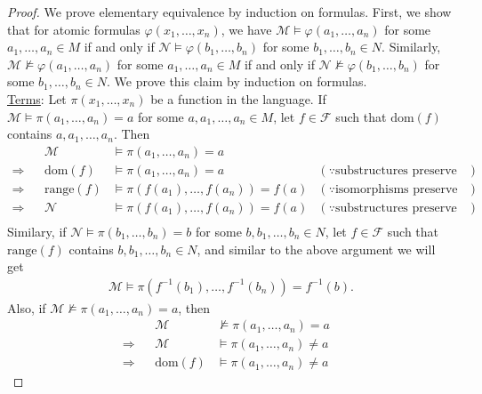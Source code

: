 \documentclass{article}
\begin{document}
\begin{enumerate}[label={\bf Q\arabic*:}]
\begin{proof}
      We prove elementary equivalence by induction on formulas. First, we
      show that for atomic formulas $\varphi(x_1,\ldots,x_n)$, we have
      $\mathcal{M}\models\varphi(a_1,\ldots,a_n)$ for some
      $a_1,\ldots,a_n\in M$ if and only if
      $\mathcal{N}\models\varphi(b_1,\ldots,b_n)$ for some
      $b_1,\ldots,b_n\in N$. Similarly,
      $\mathcal{M}\not\models\varphi(a_1,\ldots,a_n)$ for some
      $a_1,\ldots,a_n\in M$ if and only if
      $\mathcal{N}\not\models\varphi(b_1,\ldots,b_n)$ for some
      $b_1,\ldots,b_n\in N$. We prove this claim by induction on formulas.
      \\

      \underline{Terms}: Let $\pi(x_1,\ldots,x_n)$ be a function in the
      language. If $\mathcal{M}\models\pi(a_1,\ldots,a_n)=a$ for some
      $a,a_1,\ldots,a_n\in M$, let $f\in\mathcal{F}$ such that
      $\text{dom}(f)$ contains $a,a_1,\ldots,a_n$. Then
      \begin{align*}
                    && \mathcal{M}     &\models\pi(a_1,\ldots,a_n)=a  & \\
        \Rightarrow && \text{dom}(f)   &\models\pi(a_1,\ldots,a_n)=a
                    & (\because\text{substructures preserve functions}) \\
        \Rightarrow && \text{range}(f)
                    & \models\pi(f(a_1),\ldots,f(a_n))=f(a)
                    & (\because\text{isomorphisms preserve functions}) \\
        \Rightarrow && \mathcal{N}
                    & \models\pi(f(a_1),\ldots,f(a_n))=f(a)
                    & (\because\text{substructures preserve functions}). \\
      \end{align*}
      Similary, if $\mathcal{N}\models\pi(b_1,\ldots,b_n)=b$ for some
      $b,b_1,\ldots,b_n\in N$, let $f\in\mathcal{F}$ such that
      $\text{range}(f)$ contains $b,b_1,\ldots,b_n\in N$, and similar to
      the above argument we will get
      \begin{align*}
        \mathcal{M}\models\pi(f^{-1}(b_1),\ldots,f^{-1}(b_n))=f^{-1}(b).
      \end{align*}
      Also, if $\mathcal{M}\not\models\pi(a_1,\ldots,a_n)=a$, then
      \begin{align*}
                    && \mathcal{M}     &\not\models\pi(a_1,\ldots,a_n)=a & \\
        \Rightarrow && \mathcal{M}     &\models\pi(a_1,\ldots,a_n)\neq a & \\
        \Rightarrow && \text{dom}(f)   &\models\pi(a_1,\ldots,a_n)\neq a

\end{align*}
\end{proof}
\end{enumerate}
\end{document}

